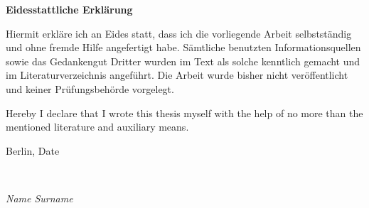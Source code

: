 \newpage

\thispagestyle{empty}

\begin{large}
\vspace*{1.4cm}
\noindent
\begin{center}
{\Large \textbf{Eidesstattliche Erkl{\"a}rung}}
\end{center}

\vspace*{0.5cm}

\noindent
Hiermit erkl{\"a}re ich an Eides statt, dass ich die vorliegende Arbeit selbstst{\"a}ndig und ohne fremde Hilfe angefertigt habe. S{\"a}mtliche benutzten Informationsquellen sowie das Gedankengut Dritter wurden im Text als solche kenntlich gemacht und im Literaturverzeichnis angef{\"u}hrt. Die Arbeit wurde bisher nicht ver{\"o}ffentlicht und keiner Pr{\"u}fungsbeh{\"o}rde vorgelegt.
\vspace{2cm}

\noindent
Hereby I declare that I wrote this thesis myself with the help of no more than the mentioned literature and auxiliary means.
\vspace{1cm}

\noindent
Berlin, Date

\vspace{3cm}

\hspace*{7cm}%
\dotfill\\
\hspace*{8.5cm}%
\begin{flushright}
\textit{Name Surname}
\end{flushright}

\end{large}

